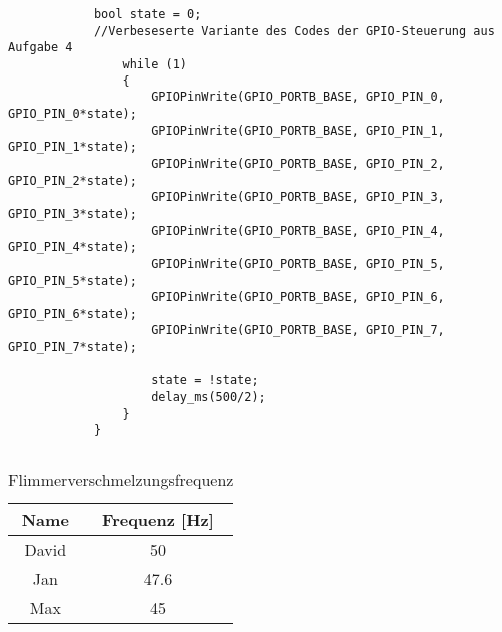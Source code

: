 \begin{lstlisting}
            bool state = 0;
            //Verbeseserte Variante des Codes der GPIO-Steuerung aus Aufgabe 4
                while (1)
                {
                    GPIOPinWrite(GPIO_PORTB_BASE, GPIO_PIN_0, GPIO_PIN_0*state);
                    GPIOPinWrite(GPIO_PORTB_BASE, GPIO_PIN_1, GPIO_PIN_1*state);
                    GPIOPinWrite(GPIO_PORTB_BASE, GPIO_PIN_2, GPIO_PIN_2*state);
                    GPIOPinWrite(GPIO_PORTB_BASE, GPIO_PIN_3, GPIO_PIN_3*state);
                    GPIOPinWrite(GPIO_PORTB_BASE, GPIO_PIN_4, GPIO_PIN_4*state);
                    GPIOPinWrite(GPIO_PORTB_BASE, GPIO_PIN_5, GPIO_PIN_5*state);
                    GPIOPinWrite(GPIO_PORTB_BASE, GPIO_PIN_6, GPIO_PIN_6*state);
                    GPIOPinWrite(GPIO_PORTB_BASE, GPIO_PIN_7, GPIO_PIN_7*state);

                    state = !state;
                    delay_ms(500/2);
                }
            }
\end{lstlisting}
\subsection{}
\begin{table}[htb]
    \centering
    \caption{Flimmerverschmelzungsfrequenz}
    \label{tab:Flimmerverschmelzungsfrequenz}
    \begin{tabular}{cc}
        \toprule
        Name & Frequenz [\si{\hertz}] \\
        \midrule
        David & \num{50}  \\
        Jan & \num{47.6} \\
        Max & \num{45} \\
        \bottomrule
    \end{tabular}
    
\end{table}